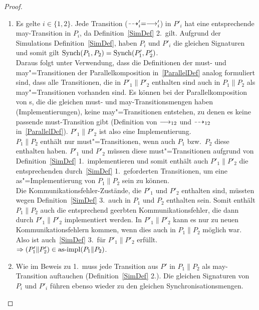 \begin{proof}\mbox{}
  \begin{enumerate}
    \item Es gelte $i\in\{1,2\}$. Jede Transition ($\may '_i =\must '_i$) in
      $P'_i$ hat eine entsprechende may-Transition in $P_i$, da
      Definition~\ref{SimDef} 2.\ gilt. Aufgrund der Simulations
      Definition~\ref{SimDef}, haben $P_i$ und $P'_i$ die gleichen Signaturen
      und somit gilt $\mathrm{Synch} (P_1,P_2) =\mathrm{Synch} (P'_1,P'_2)$.\\
      Daraus folgt unter Verwendung, dass die Definitionen der must- und
      may"=Transitionen der Parallelkomposition in~\ref{ParallelDef} analog
      formuliert sind, dass alle Transitionen, die in $P'_1\|P'_2$ enthalten
      sind auch in $P_1\|P_2$ als may"=Transitionen vorhanden sind. Es können
      bei der Parallelkomposition von \MEIO{}s, die die gleichen must- und
      may-Transitionsmengen haben (Implementierungen), keine may"=Transitionen
      entstehen, zu denen es keine passende must-Transition gibt (Definition
      von $\must _{12}$ und $\may _{12}$ in~\ref{ParallelDef}). $P'_1\|P'_2$
      ist also eine Implementierung.\\
      $P_1\|P_2$ enthält nur must"=Transitionen, wenn auch $P_1$ bzw.\ $P_2$
      diese enthalten haben. $P'_1$ und $P'_2$ müssen diese must"=Transitionen
      aufgrund von Definition~\ref{SimDef} 1.\ implementieren und somit enthält auch
      $P'_1\|P'_2$ die entsprechenden durch~\ref{SimDef} 1.\ geforderten
      Transitionen, um eine as"=Implementierung von $P_1\|P_2$ sein zu können.\\
      Die Kommunikationsfehler-Zustände, die $P'_1$ und $P'_2$ enthalten sind,
      müssten wegen Definition~\ref{SimDef} 3.\ auch in $P_1$ und $P_2$
      enthalten sein. Somit enthält $P_1\|P_2$ auch die entsprechend geerbten
      Kommunikationsfehler, die dann durch $P'_1\|P'_2$ implementiert werden.
      In $P'_1\|P'_2$ kann es nur zu neuen Kommunikationsfehlern kommen, wenn
      dies auch in $P_1\|P_2$ möglich war. Also ist auch~\ref{SimDef} 3.\ für
      $P'_1\|P'_2$ erfüllt.\\
      $\Rightarrow (P'_1\|P'_2)\in\mathrm{as}\text{-}\mathrm{impl} (P_1\|P_2)$.
    \item Wie im Beweis zu 1.\ muss jede Transition aus $P'$ in $P_1\|P_2$ als
      may-Transition auftauchen (Definition~\ref{SimDef} 2.). Die gleichen
      Signaturen von $P_i$ und $P'_i$ führen ebenso wieder zu den gleichen
      Synchronisationsmengen.\\

\end{enumerate}
\end{proof}

